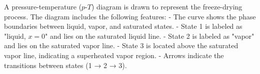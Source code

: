 A pressure-temperature (\(p\)-\(T\)) diagram is drawn to represent the freeze-drying process. The diagram includes the following features:  
- The curve shows the phase boundaries between liquid, vapor, and saturated states.  
- State 1 is labeled as "liquid, \(x = 0\)" and lies on the saturated liquid line.  
- State 2 is labeled as "vapor" and lies on the saturated vapor line.  
- State 3 is located above the saturated vapor line, indicating a superheated vapor region.  
- Arrows indicate the transitions between states (1 → 2 → 3).